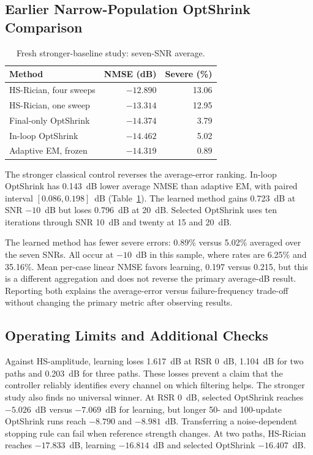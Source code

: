 \documentclass[10pt,journal,letterpaper]{IEEEtran}
\begin{document}
\subsection{Earlier Narrow-Population OptShrink Comparison}
\begin{table}[!t]
\caption{Fresh stronger-baseline study: seven-SNR average.}
\label{tab:strong}\centering\footnotesize
\begin{tabular}{@{}lrr@{}}\toprule
Method & NMSE (dB) & Severe (\%)\\\midrule
HS-Rician, four sweeps & $-12.890$ & 13.06\\
HS-Rician, one sweep & $-13.314$ & 12.95\\
Final-only OptShrink & $-14.374$ & 3.79\\
In-loop OptShrink & $-14.462$ & 5.02\\
Adaptive EM, frozen & $-14.319$ & 0.89\\\bottomrule
\end{tabular}
\end{table}
The stronger classical control reverses the average-error ranking. In-loop OptShrink has 0.143~dB lower average NMSE than adaptive EM, with paired interval $[0.086,0.198]$~dB (Table~\ref{tab:strong}). The learned method gains 0.723~dB at SNR $-10$~dB but loses 0.796~dB at 20~dB. Selected OptShrink uses ten iterations through SNR 10~dB and twenty at 15 and 20~dB.



The learned method has fewer severe errors: 0.89\% versus 5.02\% averaged over the seven SNRs. All occur at $-10$~dB in this sample, where rates are 6.25\% and 35.16\%. Mean per-case linear NMSE favors learning, 0.197 versus 0.215, but this is a different aggregation and does not reverse the primary average-dB result. Reporting both explains the average-error versus failure-frequency trade-off without changing the primary metric after observing results.







\subsection{Operating Limits and Additional Checks}
Against HS-amplitude, learning loses 1.617~dB at RSR 0~dB, 1.104~dB for two paths and 0.203~dB for three paths. These losses prevent a claim that the controller reliably identifies every channel on which filtering helps. The stronger study also finds no universal winner. At RSR 0~dB, selected OptShrink reaches $-5.026$~dB versus $-7.069$~dB for learning, but longer 50- and 100-update OptShrink runs reach $-8.790$ and $-8.981$~dB. Transferring a noise-dependent stopping rule can fail when reference strength changes. At two paths, HS-Rician reaches $-17.833$~dB, learning $-16.814$~dB and selected OptShrink $-16.407$~dB.
\end{document}
